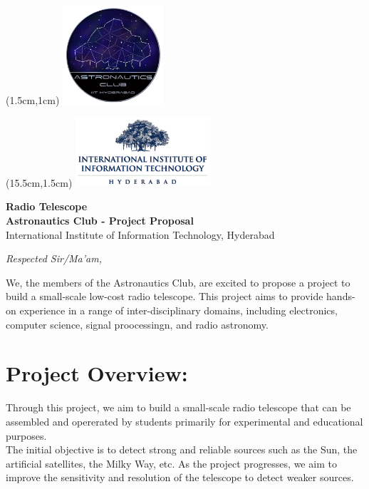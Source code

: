 \documentclass[12pt]{report}
\begin{document}
\begin{titlepage}
    \begin{flushleft}
    \begin{textblock*}{5cm}(1.5cm,1cm) 
        \includegraphics[width=3.75cm]{Astro_Club_logo.png} 
    \end{textblock*}
\end{flushleft}

\begin{flushright}
    \begin{textblock*}{5cm}(15.5cm,1.5cm) 
        \includegraphics[width=5cm]{iiith_logo.png}
    \end{textblock*}
\end{flushright}

\centering

{\huge \textbf{Radio Telescope}}\\[1em]
{\normalsize \textbf{Astronautics Club - Project Proposal}}\\
{\normalsize International Institute of Information Technology, Hyderabad}\\[5em]

\begin{flushleft}
    \textit{Respected Sir/Ma’am,}

    \medskip

    We, the members of the Astronautics Club, are excited to propose a project to build a small-scale low-cost radio telescope. This project aims to provide hands-on experience in a range of inter-disciplinary domains, including electronics, computer science, signal proocessingn, and radio astronomy.  

    \medskip
    \section*{Project Overview:}
    Through this project, we aim to build a small-scale radio telescope that can be assembled and opererated by students primarily for experimental and educational purposes. \\
     The initial objective is to detect strong and reliable sources such as the Sun, the artificial satellites, the Milky Way, etc. As the project progresses, we aim to improve the sensitivity and resolution of the telescope to detect weaker sources.\\


\end{flushleft}
\end{titlepage}
\end{document}
